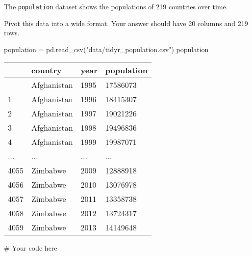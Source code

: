 \documentclass[
  letterpaper,
  DIV=11,
  numbers=noendperiod]{scrreprt}
\newenvironment{Shaded}{\begin{snugshade}}{\end{snugshade}}
\newcommand{\CommentTok}[1]{\textcolor[rgb]{0.37,0.37,0.37}{#1}}
\newcommand{\NormalTok}[1]{\textcolor[rgb]{0.00,0.23,0.31}{#1}}
\newcommand{\OperatorTok}[1]{\textcolor[rgb]{0.37,0.37,0.37}{#1}}
\newcommand{\StringTok}[1]{\textcolor[rgb]{0.13,0.47,0.30}{#1}}
\begin{document}
\begin{tcolorbox}[enhanced jigsaw, colframe=quarto-callout-tip-color-frame, opacityback=0, titlerule=0mm, bottomrule=.15mm, breakable, leftrule=.75mm, colbacktitle=quarto-callout-tip-color!10!white, title=\textcolor{quarto-callout-tip-color}{\faLightbulb}\hspace{0.5em}{Practice}, rightrule=.15mm, coltitle=black, opacitybacktitle=0.6, colback=white, left=2mm, arc=.35mm, toptitle=1mm, bottomtitle=1mm, toprule=.15mm]

The \texttt{population} dataset shows the populations of 219 countries
over time.

Pivot this data into a wide format. Your answer should have 20 columns
and 219 rows.

\begin{Shaded}
\begin{Highlighting}[]
\NormalTok{population }\OperatorTok{=}\NormalTok{ pd.read\_csv(}\StringTok{"data/tidyr\_population.csv"}\NormalTok{)}
\NormalTok{population}
\end{Highlighting}
\end{Shaded}

\begin{longtable}[]{@{}llll@{}}
\toprule\noalign{}
& country & year & population \\
\midrule\noalign{}
\endhead
\bottomrule\noalign{}
\endlastfoot
0 & Afghanistan & 1995 & 17586073 \\
1 & Afghanistan & 1996 & 18415307 \\
2 & Afghanistan & 1997 & 19021226 \\
3 & Afghanistan & 1998 & 19496836 \\
4 & Afghanistan & 1999 & 19987071 \\
... & ... & ... & ... \\
4055 & Zimbabwe & 2009 & 12888918 \\
4056 & Zimbabwe & 2010 & 13076978 \\
4057 & Zimbabwe & 2011 & 13358738 \\
4058 & Zimbabwe & 2012 & 13724317 \\
4059 & Zimbabwe & 2013 & 14149648 \\
\end{longtable}

\begin{Shaded}
\begin{Highlighting}[]
\CommentTok{\# Your code here}
\end{Highlighting}
\end{Shaded}

\end{tcolorbox}
\end{document}
